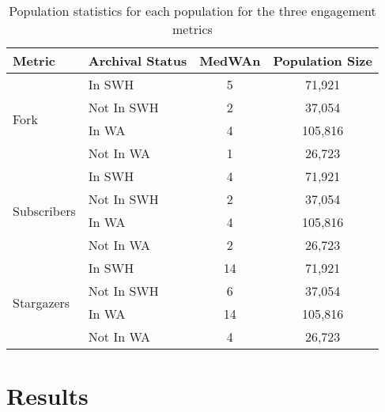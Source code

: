 \begin{table}[]
    \centering
    \begin{tabular}{|l|l|c|c|}
        \hline
        Metric & Archival Status & \multicolumn{1}{l|}{MedWAn} & \multicolumn{1}{l|}{Population Size} \\ \hline
        \multirow{4}{*}{Fork} & In SWH & 5 & 71,921 \\ \cline{2-4} 
         & Not In SWH & 2 & 37,054 \\ \cline{2-4} 
         & In WA & 4 & 105,816 \\ \cline{2-4} 
         & Not In WA & 1 & 26,723 \\ \hline
        \multirow{4}{*}{Subscribers} & In SWH & 4 & 71,921 \\ \cline{2-4} 
         & Not In SWH & 2 & 37,054 \\ \cline{2-4} 
         & In WA & 4 & 105,816 \\ \cline{2-4} 
         & Not In WA & 2 & 26,723 \\ \hline
        \multirow{4}{*}{Stargazers} & In SWH & 14 & 71,921 \\ \cline{2-4} 
         & Not In SWH & 6 & 37,054 \\ \cline{2-4} 
         & In WA & 14 & 105,816 \\ \cline{2-4} 
         & Not In WA & 4 & 26,723 \\ \hline
    \end{tabular}
\caption{Population statistics for each population for the three engagement metrics}
\label{tab:pop_stats}
\end{table}

\section{Results}

